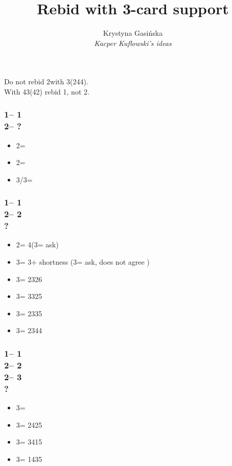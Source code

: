 \documentclass[12pt, a4paper]{article}
\title{Rebid with 3-card support}
\author{Krystyna Gasińska\\\textit{Kacper Kuflowski's ideas}}
\begin{document}
\maketitle


Do not rebid 2\spades with 3(244).\\
With 43(42) rebid 1\spades, not 2\hearts.

\subsubsection*{1\clubs -- 1\hearts\\
                2\hearts -- ?}
\begin{itemize}
    \item 2\spades = \gf
    \item 2\nt = \inv\ \spades
    \item 3\minor/3\hearts = \inv
\end{itemize}

\subsubsection*{1\clubs -- 1\hearts\\
                2\hearts -- 2\spades\\
                ?}
\begin{itemize}
    \item 2\nt = 4\hearts (3\clubs = ask)
    \item 3\clubs = 3\hearts + shortness (3\diams = ask, does not agree \hearts)
    \item 3\diams = 2326
    \item 3\hearts = 3325
    \item 3\spades = 2335
    \item 3\nt = 2344
\end{itemize}

\subsubsection*{1\clubs -- 1\hearts\\
                2\hearts -- 2\spades\\
                2\nt -- 3\clubs\\
                ?}
\begin{itemize}
    \item 3\diams = \bal
    \item 3\hearts = 2425
    \item 3\spades = 3415
    \item 3\nt = 1435
\end{itemize}
\end{document}

